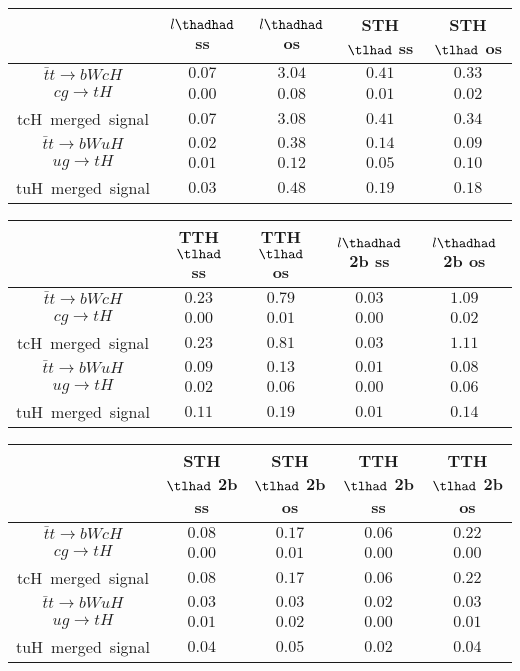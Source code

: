 \centering
\begin{tabular}{|c|c|c|c|c|} \hline
 & $l\thadhad$ ss & $l\thadhad$ os & STH $\tlhad$ ss & STH $\tlhad$ os\\\hline
$\bar{t}t\to bWcH$ & $0.07$ & $3.04$ & $0.41$ & $0.33$\\\hline
$cg\to tH$ & $0.00$ & $0.08$ & $0.01$ & $0.02$\\\hline
tcH~merged~signal & $0.07$ & $3.08$ & $0.41$ & $0.34$\\\hline
$\bar{t}t\to bWuH$ & $0.02$ & $0.38$ & $0.14$ & $0.09$\\\hline
$ug\to tH$ & $0.01$ & $0.12$ & $0.05$ & $0.10$\\\hline
tuH~merged~signal & $0.03$ & $0.48$ & $0.19$ & $0.18$\\\hline
\end{tabular}
\begin{tabular}{|c|c|c|c|c|} \hline
 & TTH $\tlhad$ ss & TTH $\tlhad$ os & $l\thadhad$ 2b ss & $l\thadhad$ 2b os\\\hline
$\bar{t}t\to bWcH$ & $0.23$ & $0.79$ & $0.03$ & $1.09$\\\hline
$cg\to tH$ & $0.00$ & $0.01$ & $0.00$ & $0.02$\\\hline
tcH~merged~signal & $0.23$ & $0.81$ & $0.03$ & $1.11$\\\hline
$\bar{t}t\to bWuH$ & $0.09$ & $0.13$ & $0.01$ & $0.08$\\\hline
$ug\to tH$ & $0.02$ & $0.06$ & $0.00$ & $0.06$\\\hline
tuH~merged~signal & $0.11$ & $0.19$ & $0.01$ & $0.14$\\\hline
\end{tabular}
\begin{tabular}{|c|c|c|c|c|} \hline
 & STH $\tlhad$ 2b ss & STH $\tlhad$ 2b os & TTH $\tlhad$ 2b ss & TTH $\tlhad$ 2b os\\\hline
$\bar{t}t\to bWcH$ & $0.08$ & $0.17$ & $0.06$ & $0.22$\\\hline
$cg\to tH$ & $0.00$ & $0.01$ & $0.00$ & $0.00$\\\hline
tcH~merged~signal & $0.08$ & $0.17$ & $0.06$ & $0.22$\\\hline
$\bar{t}t\to bWuH$ & $0.03$ & $0.03$ & $0.02$ & $0.03$\\\hline
$ug\to tH$ & $0.01$ & $0.02$ & $0.00$ & $0.01$\\\hline
tuH~merged~signal & $0.04$ & $0.05$ & $0.02$ & $0.04$\\\hline
\end{tabular}
